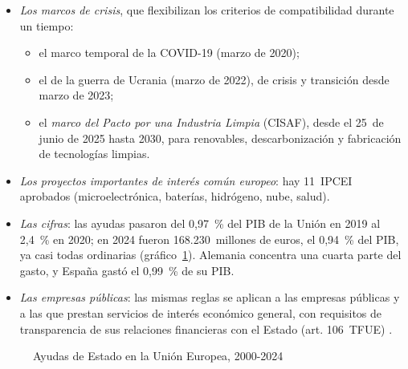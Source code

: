 \documentclass[11pt]{article}
\begin{document}
\begin{itemize}
\item \emph{Los marcos de crisis}, que flexibilizan los criterios de compatibilidad durante un tiempo:
  \begin{itemize}
  \item el marco temporal de la COVID-19 (marzo de 2020);
  \item el de la guerra de Ucrania (marzo de 2022), de crisis y transición desde marzo de 2023;
  \item el \emph{marco del Pacto por una Industria Limpia} (CISAF), desde el 25~de junio de 2025 hasta 2030, para renovables, descarbonización y fabricación de tecnologías limpias.
  \end{itemize}
\item \emph{Los proyectos importantes de interés común europeo}: hay 11~IPCEI aprobados (microelectrónica, baterías, hidrógeno, nube, salud).
\item \emph{Las cifras}: las ayudas pasaron del 0,97~\% del PIB de la Unión en 2019 al 2,4~\% en 2020; en 2024 fueron 168.230~millones de euros, el 0,94~\% del PIB, ya casi todas ordinarias (gráfico~\ref{fig:ayudas}). Alemania concentra una cuarta parte del gasto, y España gastó el 0,99~\% de su PIB\nocite{CE2026Scoreboard}.
\item \emph{Las empresas públicas}: las mismas reglas se aplican a las empresas públicas y a las que prestan servicios de interés económico general, con requisitos de transparencia de sus relaciones financieras con el Estado (art. 106~TFUE) .
\end{itemize}

\begin{figure}[H]
\centering
\caption{Ayudas de Estado en la Unión Europea, 2000-2024}\label{fig:ayudas}
\end{figure}
\end{document}
